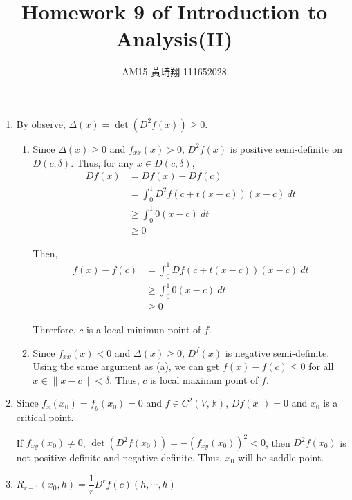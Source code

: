 \documentclass[12pt]{article}
\title{Homework 9 of Introduction to Analysis(II)}
\author{AM15 黃琦翔 111652028}
\begin{document}
\maketitle
\begin{enumerate}
    \item By observe, $\Delta(x) = \det(D^2f(x))\geq 0$.
    \begin{enumerate}
        \item Since $\Delta(x) \geq 0$ and $f_{xx}(x) > 0$, $D^2f(x)$ is positive semi-definite on $D(c, \delta)$.
        Thus, for any $x \in D(c, \delta)$, \begin{align*}
            Df(x) &= Df(x) - Df(c)\\
            &= \int_{0}^{1} D^2f(c+t(x-c))(x-c)\ dt\\
            &\geq \int_{0}^{1} 0(x-c)\ dt\\
            &\geq 0
        \end{align*}
        
        Then, \begin{align*}
            f(x) - f(c) &= \int_{0}^1 Df(c + t(x-c))(x-c)\ dt\\
            &\geq \int_{0}^{1} 0(x-c)\ dt\\
            &\geq 0
        \end{align*}

        Threrfore, $c$ is a local minimun point of $f$. 

        \item Since $f_{xx}(x) < 0$ and $\Delta(x) \geq 0$, $D^f(x)$ is negative semi-definite.
        Using the same argument as (a), we can get $f(x) - f(c) \leq 0$ for all $x\in \| x-c\| < \delta$.
        Thus, $c$ is local maximun point of $f$.

    \end{enumerate}

    \newpage
    \item Since $f_x(x_0) = f_y(x_0) = 0$ and $f \in C^2(V, \mathbb{R})$, $Df(x_0) = 0$ and $x_0$ is a critical point.
    
    If $f_{xy}(x_0)\neq 0$, $\det(D^2f(x_0)) = - (f_{xy}(x_0))^2 < 0$, then $D^2f(x_0)$ is not positive definite and negative definite.
    Thus, $x_0$ will be saddle point.

    \item $R_{r-1}(x_0, h) = \dfrac{1}{r}D^rf(c)(h, \cdots, h)$
\end{enumerate}
\end{document}
